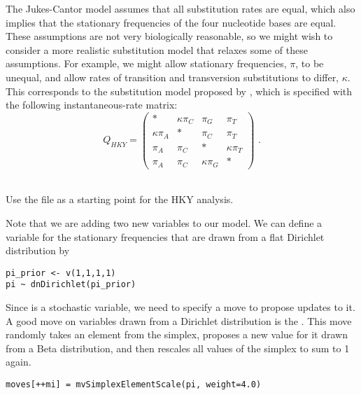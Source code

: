The Jukes-Cantor model assumes that all substitution rates are equal, which also implies that the stationary frequencies of the four nucleotide bases are equal.
These assumptions are not very biologically reasonable, so we might wish to consider a more realistic substitution model that relaxes some of these assumptions.
For example, we might allow stationary frequencies, $\pi$, to be unequal, and allow rates of transition and transversion substitutions to differ, $\kappa$.
This corresponds to the substitution model proposed by \citet[][HKY]{Hasegawa1985}, which is specified with the following instantaneous-rate matrix: 
\begin{equation*}
Q_{HKY} = \begin{pmatrix} 
{*} & {\kappa\pi_C} & {\pi_G} & {\pi_T} \\ 
{\kappa\pi_A} & {*} & {\pi_C} & {\pi_T} \\ 
{\pi_A} & {\pi_C} & {*} & {\kappa\pi_T} \\ 
{\pi_A} & {\pi_C} & {\kappa\pi_G} & {*}  
\end{pmatrix} \mbox{  .}
\end{equation*}

\noindent \\ \impmark Use the file  as a starting point for the HKY analysis.

Note that we are adding two new variables to our model.
We can define a variable  for the stationary frequencies that are drawn from a flat Dirichlet distribution by
{\tt \begin{snugshade*}
\begin{lstlisting}
pi_prior <- v(1,1,1,1) 
pi ~ dnDirichlet(pi_prior)
\end{lstlisting}
\end{snugshade*}}
Since  is a stochastic variable, we need to specify a move to propose updates to it.
A good move on variables drawn from a Dirichlet distribution is the .
This move randomly takes an element from the simplex, proposes a new value for it drawn from a Beta distribution, and then rescales all values of the simplex to sum to 1 again.
{\tt \begin{snugshade*}
\begin{lstlisting}
moves[++mi] = mvSimplexElementScale(pi, weight=4.0)
\end{lstlisting}
\end{snugshade*}}

